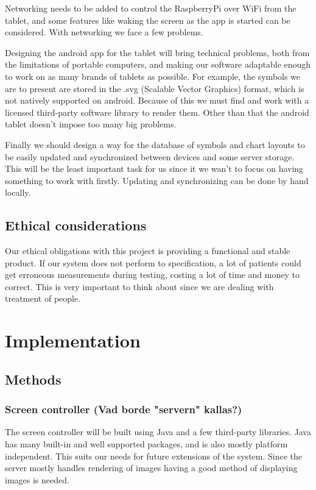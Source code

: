 \documentclass[12pt,a4paper,notitlepage]{report}
\begin{document}
Networking needs to be added to control the RaspberryPi over WiFi from the tablet, and some features like waking the screen as the app is started can be considered. With networking we face a few problems. %

Designing the android app for the tablet will bring technical problems, both from the limitations of portable computers, and making our software adaptable enough to work on as many brands of tablets as possible. For example, the symbols we are to present are stored in the .svg (Scalable Vector Graphics) format, which is not natively supported on android. Because of this we must find and work with a licensed third-party software library to render them. Other than that the android tablet doesn't impose too many big problems. %

Finally we should design a way for the database of symbols and chart layouts to be easily updated and synchronized between devices and some server storage. This will be the least important task for us since it we wan't to focus on having something to work with firstly. Updating and synchronizing can be done by hand locally.

\section{Ethical considerations} %
Our ethical obligations with this project is providing a functional and stable product. If our system does not perform to specification, a lot of patients could get erroneous measurements during testing, costing a lot of time and money to correct. This is very important to think about since we are dealing with treatment of people.

\chapter{Implementation}
\section{Methods}

\subsection{Screen controller (Vad borde "servern" kallas?)}
The screen controller will be built using Java and a few third-party libraries. Java has many built-in and well supported packages, and is also mostly platform independent. This suits our needs for future extensions of the system. Since the server mostly handles rendering of images having a good method of displaying images is needed. 
\end{document}
